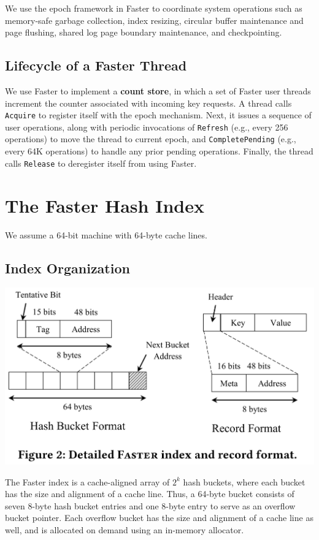 \documentclass[11pt]{article}
\begin{document}
We use the epoch framework in Faster to coordinate system operations such as memory-safe garbage
collection, index resizing, circular buffer maintenance and page flushing, shared log page boundary
maintenance, and checkpointing.
\subsection{Lifecycle of a Faster Thread}
\label{sec:orgc8f8766}
We use Faster to implement a \textbf{count store}, in which a set of Faster user threads increment the counter
associated with incoming key requests. A thread calls \texttt{Acquire} to register itself with the epoch
mechanism. Next, it issues a sequence of user operations, along with periodic invocations of \texttt{Refresh}
(e.g., every 256 operations) to move the thread to current epoch, and \texttt{CompletePending} (e.g., every 64K
operations) to handle any prior pending operations. Finally, the thread calls \texttt{Release} to deregister
itself from using Faster.
\section{The Faster Hash Index}
\label{sec:org806f6e3}
We assume a 64-bit machine with 64-byte cache lines.
\subsection{Index Organization}
\label{sec:orgc17a503}
\begin{center}
\includegraphics[width=.8\textwidth]{../../images/papers/220.png}
\label{f2}
\end{center}

The Faster index is a cache-aligned array of \(2^k\) hash buckets, where each bucket has the size and
alignment of a cache line. Thus, a 64-byte bucket consists of seven 8-byte hash bucket entries and one
8-byte entry to serve as an overflow bucket pointer. Each overflow bucket has the size and alignment
of a cache line as well, and is allocated on demand using an in-memory allocator.
\end{document}
